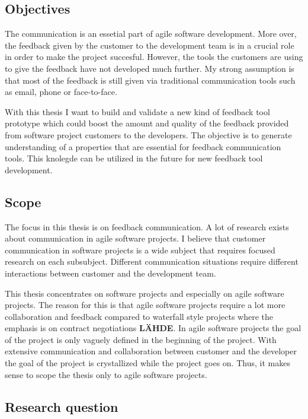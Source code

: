 \documentclass[english,12pt,a4paper,pdftex]{article}
\begin{document}
\subsection{Objectives}

The communication is an essetial part of agile software development. More over, the feedback given by the customer to the development team is in a crucial role in order to make the project succesful. However, the tools the customers are using to give the feedback have not developed much further. My strong assumption is that most of the feedback is still given via traditional communication tools such as email, phone or face-to-face.

With this thesis I want to build and validate a new kind of feedback tool prototype which could boost the amount and quality of the feedback provided from software project customers to the developers. The objective is to generate understanding of a properties that are essential for feedback communication tools. This knolegde can be utilized in the future for new feedback tool development.

\subsection{Scope}

The focus in this thesis is on feedback communication. A lot of research exists about communication in agile software projects. I believe that customer communication in software projects is a wide subject that requires focused research on each subsubject. Different communication situations require different interactions between customer and the development team. 

This thesis concentrates on software projects and especially on agile software projects. The reason for this is that agile software projects require a lot more collaboration and feedback compared to waterfall style projects where the emphasis is on contract negotiations \textbf{LÄHDE}. In agile software projects the goal of the project is only vaguely defined in the beginning of the project. With extensive communication and collaboration between customer and the developer the goal of the project is crystallized while the project goes on. Thus, it makes sense to scope the thesis only to agile software projects. 

\subsection{Research question}
\end{document}
